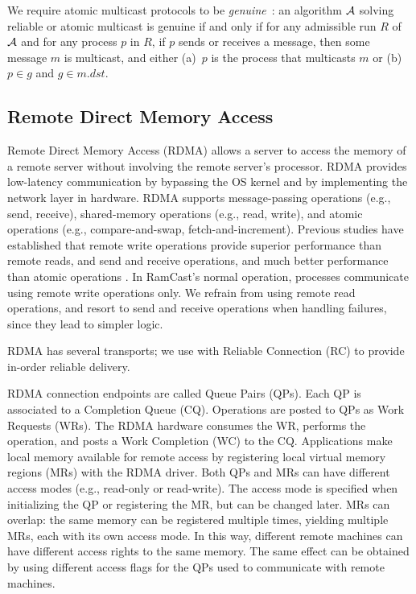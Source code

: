 We require atomic multicast protocols to be \emph{genuine}~\cite{GS01b}: 
an algorithm ${\cal A}$ solving reliable or atomic multicast is genuine
if and only if for any admissible run $R$ of ${\cal A}$ and for any process $p$ in $R$, if $p$ sends or receives a message, then some message $m$ is multicast, and either (a)~$p$ is the process that multicasts $m$ or (b)~$p \in g$ and $g \in m.dst$.


\subsection{Remote Direct Memory Access}
\label{sec:rdma}

Remote Direct Memory Access (RDMA) allows a server to access the memory of a remote server without involving the remote server's processor. 
RDMA provides low-latency communication by bypassing the OS kernel and by implementing the network layer in hardware.
RDMA supports message-passing operations (e.g., send, receive), shared-memory operations (e.g., read, write), and atomic operations (e.g., compare-and-swap, fetch-and-increment). 
Previous studies have established that remote write operations provide superior performance than remote reads, and send and receive operations, and much better performance than atomic operations \cite{x}.
In RamCast's normal operation, processes communicate using remote write operations only.
We refrain from using remote read operations, and resort to send and receive operations when handling failures, since they lead to simpler logic.

RDMA has several transports; we use with Reliable Connection (RC) to provide in-order reliable delivery.

RDMA connection endpoints are called Queue Pairs (QPs). Each QP is associated to a Completion Queue (CQ). 
Operations are posted to QPs as Work Requests (WRs). 
The RDMA hardware consumes the WR, performs the operation, and posts a Work Completion (WC) to the CQ. 
Applications make local memory available for remote access by registering local virtual memory regions (MRs) with the RDMA driver. 
Both QPs and MRs can have different access modes (e.g., read-only or read-write). 
The access mode is specified when initializing the QP or registering the MR, but can be changed later. 
MRs can overlap: the same memory can be registered multiple times, yielding multiple MRs, each with its own access mode. 
In this way, different remote machines can have different access rights to the same memory. 
The same effect can be obtained by using different access flags for the QPs used to communicate with remote machines.





